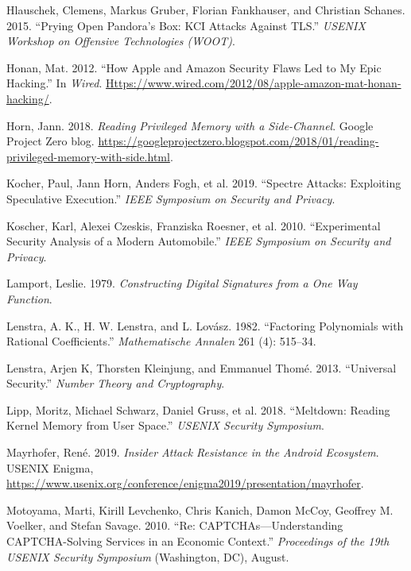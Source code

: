 \documentclass[
  letterpaper,
]{scrbook}
\newlength{\cslhangindent}
\newenvironment{CSLReferences}[2] %
 {\begin{list}{}{%
  \setlength{\itemindent}{0pt}
  \setlength{\leftmargin}{0pt}
  \setlength{\parsep}{0pt}
  \ifodd #1
   \setlength{\leftmargin}{\cslhangindent}
   \setlength{\itemindent}{-1\cslhangindent}
  \fi
  \setlength{\itemsep}{#2\baselineskip}}}
 {\end{list}}
\theoremstyle{definition}
\theoremstyle{plain}
\theoremstyle{plain}
\theoremstyle{remark}
\begin{document}
\begin{CSLReferences}{1}{1}
Hlauschek, Clemens, Markus Gruber, Florian Fankhauser, and Christian
Schanes. 2015. {``Prying Open {Pandora's} Box: {KCI} Attacks Against
{TLS}.''} \emph{USENIX Workshop on Offensive Technologies (WOOT)}.

Honan, Mat. 2012. {``How {Apple} and {Amazon} Security Flaws Led to My
Epic Hacking.''} In \emph{Wired}.
\href{https://www.wired.com/2012/08/apple-amazon-mat-honan-hacking/}{Https://www.wired.com/2012/08/apple-amazon-mat-honan-hacking/}.

Horn, Jann. 2018. \emph{Reading Privileged Memory with a Side-Channel}.
Google Project Zero blog.
\url{https://googleprojectzero.blogspot.com/2018/01/reading-privileged-memory-with-side.html}.

Kocher, Paul, Jann Horn, Anders Fogh, et al. 2019. {``Spectre Attacks:
Exploiting Speculative Execution.''} \emph{IEEE Symposium on Security
and Privacy}.

{Koscher, Karl, Alexei Czeskis, Franziska Roesner, et al.} 2010.
{``Experimental Security Analysis of a Modern Automobile.''} \emph{IEEE
Symposium on Security and Privacy}.

Lamport, Leslie. 1979. \emph{Constructing Digital Signatures from a One
Way Function}.

Lenstra, A. K., H. W. Lenstra, and L. Lovász. 1982. {``Factoring
Polynomials with Rational Coefficients.''} \emph{Mathematische Annalen}
261 (4): 515--34.

Lenstra, Arjen K, Thorsten Kleinjung, and Emmanuel Thomé. 2013.
{``Universal Security.''} \emph{Number Theory and Cryptography}.

Lipp, Moritz, Michael Schwarz, Daniel Gruss, et al. 2018. {``Meltdown:
Reading Kernel Memory from User Space.''} \emph{USENIX Security
Symposium}.

Mayrhofer, René. 2019. \emph{Insider Attack Resistance in the {Android}
Ecosystem}. USENIX Enigma,
\url{https://www.usenix.org/conference/enigma2019/presentation/mayrhofer}.

Motoyama, Marti, Kirill Levchenko, Chris Kanich, Damon McCoy, Geoffrey
M. Voelker, and Stefan Savage. 2010. {``Re: {CAPTCHAs}---Understanding
{CAPTCHA}-Solving Services in an Economic Context.''} \emph{Proceedings
of the 19th {USENIX} Security Symposium} (Washington, DC), August.


\end{CSLReferences}
\end{document}
